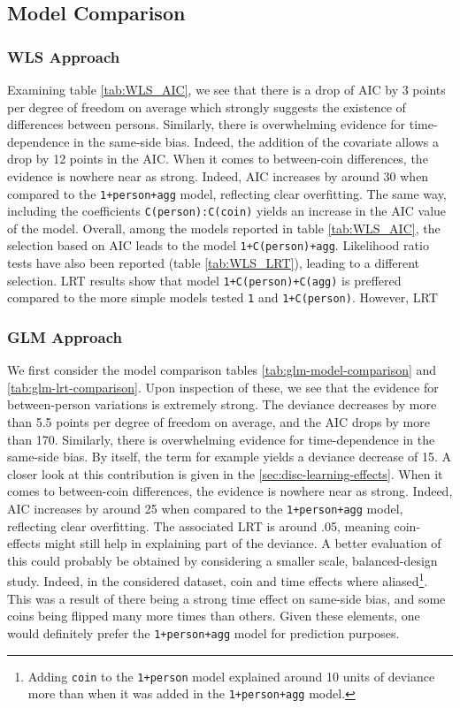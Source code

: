 \documentclass[a4paper, 12pt,oneside]{article}
\begin{document}
		\subsection{Model Comparison}
		\subsubsection{WLS Approach}
		Examining table \ref{tab:WLS_AIC}, we see that there is a drop of AIC by 3 points per degree of freedom on average which strongly suggests the existence of differences between persons. Similarly, there is overwhelming evidence for time-dependence in the same-side bias. Indeed, the addition of the  covariate allows a drop by 12 points in the AIC. When it comes to between-coin differences, the evidence is nowhere near as strong. Indeed, AIC increases by around 30 when compared to the \texttt{1+person+agg} model, reflecting clear overfitting.
		The same way, including the coefficients \texttt{C(person):C(coin)} yields an increase in the AIC value of the model. 
		Overall, among the models reported in table \ref{tab:WLS_AIC}, the selection based on AIC leads to the model \texttt{1+C(person)+agg}. 
		Likelihood ratio tests have also been reported (table \ref{tab:WLS_LRT}), leading to a different selection. LRT results show that model \texttt{1+C(person)+C(agg)} is preffered compared to the more simple models tested \texttt{1} and \texttt{1+C(person)}. However, LRT

		\subsubsection{GLM Approach}
			We first consider the model comparison tables \ref{tab:glm-model-comparison} and \ref{tab:glm-lrt-comparison}. 
			Upon inspection of these, we see that the evidence for between-person variations is extremely strong. The deviance decreases by more than 5.5 points per degree of freedom on average, and the AIC drops by more than 170. Similarly, there is overwhelming evidence for time-dependence in the same-side bias. By itself, the term for example yields a deviance decrease of 15. A closer look at this contribution is given in the \ref{sec:disc-learning-effects}. When it comes to between-coin differences, the evidence is nowhere near as strong. Indeed, AIC increases by around 25 when compared to the \texttt{1+person+agg} model, reflecting clear overfitting. The associated LRT is around .05, meaning coin-effects might still help in explaining part of the deviance. A better evaluation of this could probably be obtained by considering a smaller scale, balanced-design study. Indeed, in the considered dataset, coin and time effects where aliased\footnote{Adding \texttt{coin} to the \texttt{1+person} model explained around 10 units of deviance more than when it was added in the \texttt{1+person+agg} model.}. This was a result of there being a strong time effect on same-side bias, and some coins being flipped many more times than others. 
			Given these elements, one would definitely prefer the \texttt{1+person+agg} model for prediction purposes.  
\end{document}
